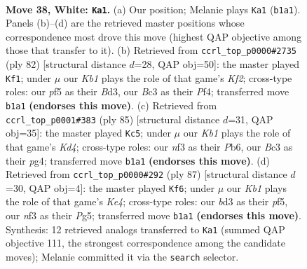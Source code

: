 \documentclass[11pt]{article}
\begin{document}
\clearpage

\begin{figure}[p]\centering
\begin{subfigure}{0.46\textwidth}\centering
\resizebox{\linewidth}{!}{%
\newchessgame
\chessboard[
  setfen={6k1/3N4/8/3p1p2/2p2P2/1pBb1n2/1P6/1K5B w - - 12 38},
  showmover=false,
  pgfstyle=straightmove, color=movearrow, markmove={b1-a1}
]}
\caption{}
\end{subfigure}\hfill
\begin{subfigure}{0.46\textwidth}\centering
\resizebox{\linewidth}{!}{%
\newchessgame
\chessboard[
  setfen={8/5k2/4p1p1/2b1B2p/5P2/3B2PP/b4K2/8 w - - 2 42},
  showmover=false,
  pgfstyle=straightmove, color=movearrow, markmove={f2-f1}
]}
\caption{}
\end{subfigure}
\\[4pt]
\begin{subfigure}{0.46\textwidth}\centering
\resizebox{\linewidth}{!}{%
\newchessgame
\chessboard[
  setfen={8/8/1p3p2/3k2p1/Pp2B1P1/1P1K1P2/1b6/8 b - - 9 43},
  showmover=false,
  pgfstyle=straightmove, color=movearrow, markmove={d5-c5}
]}
\caption{}
\end{subfigure}\hfill
\begin{subfigure}{0.46\textwidth}\centering
\resizebox{\linewidth}{!}{%
\newchessgame
\chessboard[
  setfen={8/8/7p/pB2kPp1/P5P1/4K2P/8/4b3 b - - 4 44},
  showmover=false,
  pgfstyle=straightmove, color=movearrow, markmove={e5-f6}
]}
\caption{}
\end{subfigure}
\caption{\textbf{Move 38, White: \texttt{Ka1}.} (a) Our position; Melanie plays \texttt{Ka1} (\texttt{b1a1}). Panels (b)--(d) are the retrieved master positions whose correspondence most drove this move (highest QAP objective among those that transfer to it). (b) Retrieved from \texttt{ccrl\_top\_p0000\#2735} (ply 82) [structural distance $d$=28, QAP obj=50]: the master played \texttt{Kf1}; under $\mu$ our \emph{Kb1} plays the role of that game's \emph{Kf2}; cross-type roles: our \emph{p}f5 as their \emph{B}d3, our \emph{B}c3 as their \emph{P}f4; transferred move \texttt{b1a1} \textbf{(endorses this move)}. (c) Retrieved from \texttt{ccrl\_top\_p0001\#383} (ply 85) [structural distance $d$=31, QAP obj=35]: the master played \texttt{Kc5}; under $\mu$ our \emph{Kb1} plays the role of that game's \emph{Kd4}; cross-type roles: our \emph{n}f3 as their \emph{P}b6, our \emph{B}c3 as their \emph{p}g4; transferred move \texttt{b1a1} \textbf{(endorses this move)}. (d) Retrieved from \texttt{ccrl\_top\_p0000\#292} (ply 87) [structural distance $d$=30, QAP obj=4]: the master played \texttt{Kf6}; under $\mu$ our \emph{Kb1} plays the role of that game's \emph{Ke4}; cross-type roles: our \emph{b}d3 as their \emph{p}f5, our \emph{n}f3 as their \emph{P}g5; transferred move \texttt{b1a1} \textbf{(endorses this move)}. Synthesis: 12 retrieved analogs transferred to \texttt{Ka1} (summed QAP objective 111, the strongest correspondence among the candidate moves); Melanie committed it via the \texttt{search} selector.}
\label{fig:thought-m74}
\end{figure}
\end{document}
